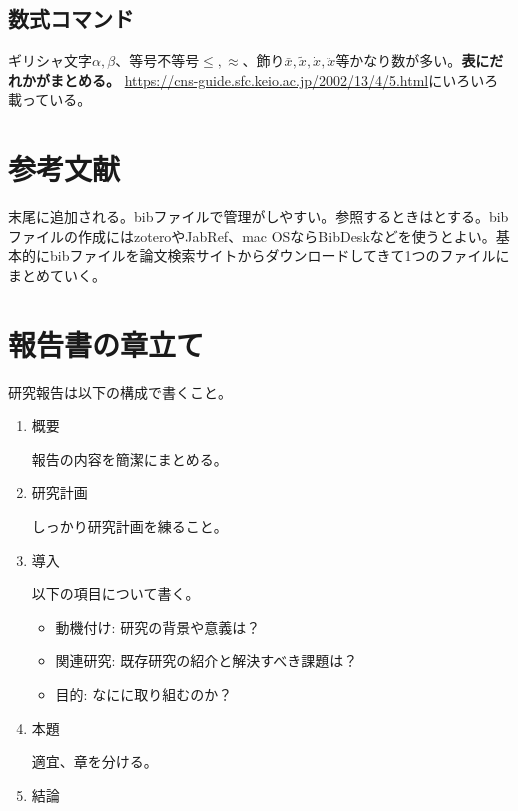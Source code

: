 \documentclass[uplatex,dvipdfmx,a4j,12pt,twocolumn]{jsarticle}
\begin{document}
\subsection{数式コマンド}
ギリシャ文字$\alpha,\beta$、等号不等号$\leq,\approx$、飾り$\bar{x},\tilde{x},\dot{x},\ddot{x}$等かなり数が多い。\textbf{表にだれかがまとめる。}
\url{https://cns-guide.sfc.keio.ac.jp/2002/13/4/5.html}にいろいろ載っている。

\section{参考文献}
末尾に追加される。bibファイルで管理がしやすい。参照するときは\cite{Fujiwara1984}とする。bibファイルの作成にはzoteroやJabRef、mac OSならBibDeskなどを使うとよい。基本的にbibファイルを論文検索サイトからダウンロードしてきて1つのファイルにまとめていく。


\section{報告書の章立て}
研究報告は以下の構成で書くこと。
\begin{enumerate}
    \item 概要

    報告の内容を簡潔にまとめる。

    \item 研究計画
    
    しっかり研究計画を練ること。

    \item 導入

    以下の項目について書く。

    \begin{itemize}
        \item 動機付け: 研究の背景や意義は？
        \item 関連研究: 既存研究の紹介と解決すべき課題は？
        \item 目的: なにに取り組むのか？
    \end{itemize}

    \item 本題

    適宜、章を分ける。

    \item 結論
    
\end{enumerate}


\end{document}

